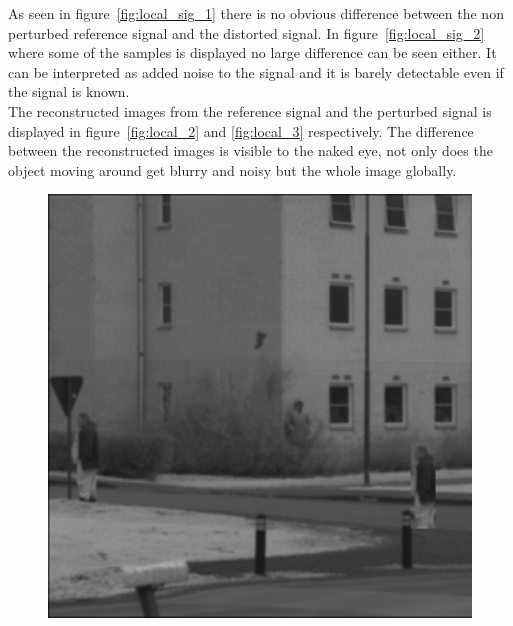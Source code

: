 As seen in figure~\ref{fig:local_sig_1} there is no obvious difference between the non perturbed reference signal and the distorted signal. In figure~\ref{fig:local_sig_2} where some of the samples is displayed no large difference can be seen either. It can be interpreted as added noise to the signal and it is barely detectable even if the signal is known.\\[0.1in]

The reconstructed images from the reference signal and the perturbed signal is displayed in figure~\ref{fig:local_2} and \ref{fig:local_3} respectively. The difference between the reconstructed images is visible to the naked eye, not only does the object moving around get blurry and noisy but the whole image globally.


\begin{figure}[H]
    \centering
\begin{minipage}[t]{0.32\textwidth}
    \includegraphics[width=1\textwidth]{result/dynamic/local/local_whole_time_org.png}
    \subcaption{}
    \label{fig:local_1}
\end{minipage}
\begin{minipage}[t]{0.32\textwidth}

\end{minipage}
\end{figure}
